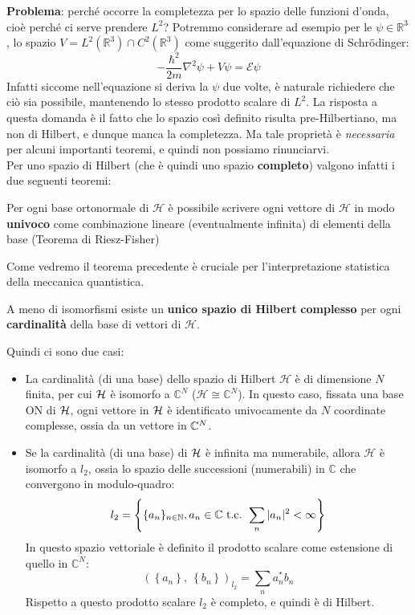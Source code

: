 \documentclass[FisicaTeorica.tex]{subfiles}
\begin{document}
\textbf{Problema}: perché occorre la completezza per lo spazio delle funzioni d'onda, cioè perché ci serve prendere $L^2$? Potremmo considerare ad esempio per le $\psi\in\mathbb{R}^3$, lo spazio $V=L^2\left(\mathbb{R}^3\right)\cap C^2(\mathbb{R}^3)$ come suggerito dall'equazione di Schrödinger:
\[
	-\frac{\hbar^2}{2m} \nabla^2 \psi+V\psi=\mathcal{E}\psi
\]
Infatti siccome nell'equazione si deriva la $\psi$ due volte, è naturale richiedere che ciò sia possibile, mantenendo lo stesso prodotto scalare di $L^2$. La risposta a questa domanda è il fatto che lo spazio così definito risulta pre-Hilbertiano, ma non di Hilbert, e dunque manca la completezza. Ma tale proprietà è \textit{necessaria} per alcuni importanti teoremi, e quindi non possiamo rinunciarvi.\\
Per uno spazio di Hilbert (che è quindi uno spazio \textbf{completo}) valgono infatti i due seguenti teoremi:
\begin{thm}
Per ogni base ortonormale di $\mathcal{H}$ è possibile scrivere ogni vettore di $\mathcal{H}$ in modo \textbf{univoco} come combinazione lineare (eventualmente infinita) di elementi della base (Teorema di Riesz-Fisher)
\end{thm}
Come vedremo  il teorema precedente è cruciale per l'interpretazione statistica della meccanica quantistica.
\begin{thm}
A meno di isomorfismi esiste un \textbf{unico spazio di Hilbert} \textbf{complesso} per ogni \textbf{cardinalità} della base di vettori di $\mathcal{H}$.
\end{thm}
Quindi ci sono due casi:
\begin{itemize}
    \item La cardinalità (di una base) dello spazio di Hilbert $\mathcal{H}$ è di dimensione $N$ finita, per cui $\mathcal{H}$ è isomorfo a $\mathbb{C}^N$  ($\mathcal{H}\cong\mathbb{C}^N$). In questo caso, fissata una base ON di $\mathcal{H}$, ogni vettore in $\mathcal{H}$ è identificato univocamente da $N$ coordinate complesse, ossia da un vettore in $\mathbb{C}^N$.
    \item Se la cardinalità (di una base) di $\mathcal{H}$ è infinita ma numerabile, allora $\mathcal{H}$ è isomorfo a $l_2$, ossia lo spazio delle successioni (numerabili) in $\mathbb C$  che convergono in modulo-quadro:
    \[
	l_2 = \left \{ \{a_n\}_{n\in\mathbb{N}}, a_n \in \mathbb{C} \text{ t.c. } \sum_n |a_n|^2 < \infty \right \}
	\]
	In questo spazio vettoriale è definito il prodotto scalare come estensione di quello in $\mathbb{C}^N$:
	\[
	\left(\left\{a_n\right\},\ \left\{b_n\right\}\right)_{l_2}= \sum_{n}{a_n^* b_n}
	\]
    Rispetto a questo prodotto scalare $l_2$ è completo, e quindi è di Hilbert. 
    \end{itemize}
\end{document}
